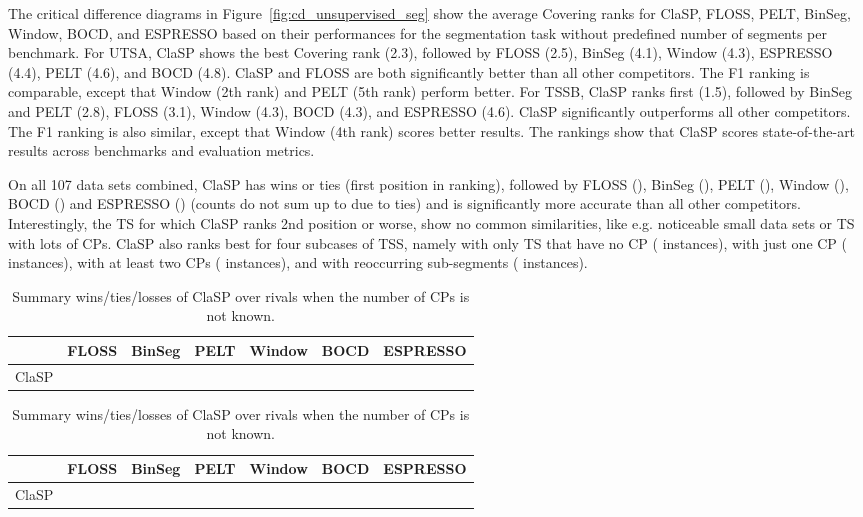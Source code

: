 \documentclass[pdflatex,sn-basic]{sn-jnl}
\begin{document}
The critical difference diagrams in Figure~\ref{fig:cd_unsupervised_seg} show the average Covering ranks for ClaSP, FLOSS, PELT, BinSeg, Window, BOCD, and ESPRESSO based on their performances for the segmentation task without predefined number of segments per benchmark. For UTSA, ClaSP shows the best Covering rank (2.3), followed by FLOSS (2.5), BinSeg (4.1), Window (4.3), ESPRESSO (4.4), PELT (4.6), and BOCD (4.8). ClaSP and FLOSS are both significantly better than all other competitors. The F1 ranking is comparable, except that Window (2th rank) and PELT (5th rank) perform better. For TSSB, ClaSP ranks first (1.5), followed by BinSeg and PELT (2.8), FLOSS (3.1), Window (4.3), BOCD (4.3), and ESPRESSO (4.6). ClaSP significantly outperforms all other competitors. The F1 ranking is also similar, except that Window (4th rank) scores better results. The rankings show that ClaSP scores state-of-the-art results across benchmarks and evaluation metrics.

On all 107 data sets combined, ClaSP has  wins or ties (first position in ranking), followed by FLOSS (), BinSeg (), PELT (), Window (), BOCD () and ESPRESSO () (counts do not sum up to  due to ties) and is significantly more accurate than all other competitors. Interestingly, the  TS for which ClaSP ranks 2nd position or worse, show no common similarities, like e.g. noticeable small data sets or TS with lots of CPs. ClaSP also ranks best for four subcases of TSS, namely with only TS that have no CP ( instances), with just one CP ( instances), with at least two CPs ( instances), and with reoccurring sub-segments ( instances).

\begin{table}[t]
	\caption{Summary wins/ties/losses of ClaSP over rivals when the number of CPs is not known.\label{tab:unsupervised_wtl}}	
	
	\begin{minipage}{12cm}
        \begin{centering}
    		\begin{tabular}{c|cccccc}
    			\toprule 			
    			& FLOSS & BinSeg & PELT & Window & BOCD & ESPRESSO \tabularnewline
    			\hline 
    			ClaSP &  &  &  &  &  &  \tabularnewline
    			\bottomrule 			
    		\end{tabular}
    	\par\end{centering}    
	\end{minipage}

	\begin{minipage}{12cm}
        \begin{centering}
    		\begin{tabular}{c|cccccc}
    			\toprule 			
    			& FLOSS & BinSeg & PELT & Window & BOCD & ESPRESSO \tabularnewline
    			\hline 
    			ClaSP &  &  &  &  &  &  \tabularnewline
    			\bottomrule 			
    		\end{tabular}
	    \par\end{centering}
	\end{minipage}

\end{table}
\end{document}
